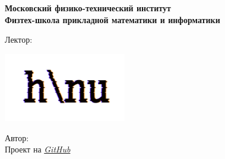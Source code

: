 \begin{titlepage}
	\clearpage\thispagestyle{empty}
	\centering

	\textbf{Московский физико-технический институт \\ Физтех-школа прикладной математики и информатики}
	\vspace{33ex}

	{\textbf{\FullCourseNameFirstPart}}

	\SemesterNumber
	\vspace{1ex}

	Лектор: \textit{\LecturerInitials}

	\includegraphics[width=0.4\textwidth]{images/logo_ltc.png}

	\begin{flushright}
		\noindent
		Автор: \href{\TGLink}{\textit{\AuthorInitials}}
		\\
		Проект на \href{\GitHubLink}{\textit{GitHub}}
	\end{flushright}

	\vfill
	\CourseDate
	\pagebreak
\end{titlepage}
